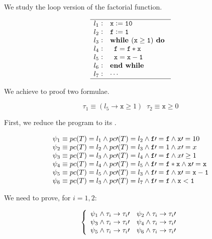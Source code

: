 


We study the loop version of the factorial function.


\[
	\begin{array}{l@{\hspace{0.3em}}c@{\hspace{1em}}l}
	\hline
		l_1 & : & \mathtt{x := 10} \\
		l_2 & : & \mathtt{f := 1} \\
		l_3 & : & \mathtt{\textbf{while } (x\geq 1) \textbf{ do }} \\
		l_4 & : & \mathtt{\;\;f = f*x} \\
		l_5 & : & \mathtt{\;\;x=x-1} \\ 	
		l_6 & : & \mathtt{\textbf{end while}}\\
		l_7 & : & \mathtt{\cdots}\\
	\hline
	\end{array}
\]
\label{simple:example}




We achieve to proof two formulae.

\[\tau_1 \equiv (l_5 \to \mathtt{x}\geq 1) \;\; \tau_2 \equiv \mathtt{x} \geq 0\]

First, we reduce the program to its \VC.


\[
	\begin{array}{l}
		 \psi_1 \equiv pc(T) = l_1 \wedge pc\prime (T) = l_2 \wedge \mathtt{f\prime =f} \wedge \mathtt{x}\prime  = 10\\
		 \psi_2 \equiv pc(T) = l_2 \wedge pc\prime (T) = l_3 \wedge \mathtt{f}\prime  = 1 \wedge x\prime =x\\
		 \psi_3 \equiv pc(T) = l_3 \wedge pc\prime (T) = l_4 \wedge \mathtt{f\prime =f} \wedge x\prime \geq 1\\
		 \psi_4 \equiv pc(T) = l_4 \wedge pc\prime (T) = l_5 \wedge \mathtt{f}\prime  = \mathtt{f*x} \wedge \mathtt{x\prime =x}\\
		 \psi_5 \equiv pc(T) = l_5 \wedge pc\prime (T) = l_3 \wedge \mathtt{f\prime =f} \wedge \mathtt{x\prime =x-1}\\
		 \psi_6 \equiv pc(T) = l_3 \wedge pc\prime (T) = l_7 \wedge \mathtt{f\prime =f} \wedge \mathtt{x<1}
	\end{array}
\]

We need to prove, for $i=1,2$:

\[
	\left\{
		\begin{array}{lr}
			\psi_1 \wedge \tau_i \to \tau_i\prime  &
			\psi_2 \wedge \tau_i \to \tau_i\prime \\
			\psi_3 \wedge \tau_i \to \tau_i\prime  &
			\psi_4 \wedge \tau_i \to \tau_i\prime \\
			\psi_5 \wedge \tau_i \to \tau_i\prime  &
			\psi_6 \wedge \tau_i \to \tau_i\prime 
		\end{array}
	\right.
\]

